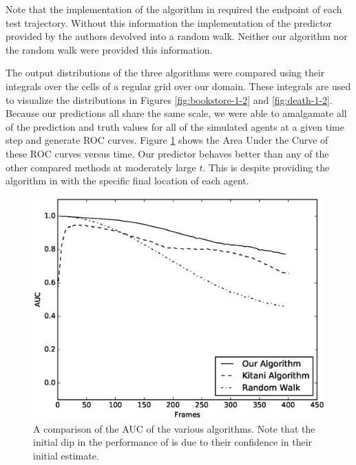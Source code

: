 \documentclass[letterpaper,10pt,conference]{ieeeconf}
\begin{document}
Note that the implementation of the algorithm in \cite{Kitani2012} required the endpoint of each test trajectory. 
Without this information the implementation of the predictor provided by the authors devolved into a random walk.
Neither our algorithm nor the random walk were provided this information.

The output distributions of the three algorithms were compared using their integrals over the cells of a regular grid over our domain. 
These integrals are used to visualize the distributions in Figures \ref{fig:bookstore-1-2} and \ref{fig:death-1-2}.
Because our predictions all share the same scale, we were able to amalgamate all of the prediction and truth values for all of the simulated agents at a given time step and generate ROC curves. 
Figure \ref{fig:auc_vs_time} shows the Area Under the Curve of these ROC curves versus time.
Our predictor behaves better than any of the other compared methods at moderately large $t$.
This is despite providing the algorithm in \cite{Kitani2012} with the specific final location of each agent.

\begin{figure}
	\centering
	\includegraphics[width=\linewidth]{./figures/the_results.eps}
	\caption{A comparison of the AUC of the various algorithms. Note that the initial dip in the performance of \cite{Kitani2012} is due to their confidence in their initial estimate.}
	\label{fig:auc_vs_time}
\end{figure}
\end{document}
